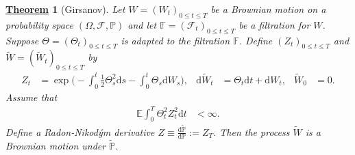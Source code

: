 \documentclass[12pt]{book}
\numberwithin{equation}{chapter}
\theoremstyle{plain}
\newtheorem{theorem}{\underline{Theorem}}
\numberwithin{theorem}{section}
\theoremstyle{definition}
\numberwithin{exercise}{chapter}
\newcommand{\<}{\langle}
\renewcommand{\>}{\rangle}
\renewcommand{\(}{\left(}
\renewcommand{\)}{\right)}
\renewcommand{\[}{\left[}
\renewcommand{\]}{\right]}
\newcommand\Eb{\mathds{E}}
\newcommand\Fb{\mathds{F}}
\newcommand\Pb{\mathds{P}}
\newcommand\Fc{\mathscr{F}}
\newcommand\Om{\Omega}
\newcommand\Pbt{\widetilde{\Pb}}
\newcommand\Wt{\widetilde{W}}
\newcommand\dd{\mathrm{d}}
\begin{document}
\begin{theorem}[Girsanov]
\label{thm:girsanov}
Let $W = (W_t)_{0 \leq t \leq T}$ be a Brownian motion on a probability space $(\Om,\Fc,\Pb)$ and let $\Fb=(\Fc_t)_{0 \leq t \leq T}$ be a filtration for $W$.  Suppose $\Theta = (\Theta_t)_{0 \leq t \leq T}$ is adapted to the filtration $\Fb$.  
Define $(Z_t)_{0 \leq t \leq T}$ and $\Wt = (\Wt_t)_{0 \leq t \leq T}$ by
\begin{align}
Z_t
	&=	\exp \Big( - \int_0^t \tfrac{1}{2} \Theta_s^2 \dd s - \int_0^t \Theta_s \dd W_s \Big) , &
\dd \Wt_t
	&=	\Theta_t \dd t + \dd W_t , &
\Wt_0
	&=	0 .
\end{align}
Assume that
\begin{align}
\Eb \int_0^T \Theta_t^2 Z_t^2 \dd t
	&< \infty .
\end{align}
Define a Radon-Nikod\'ym derivative $Z \equiv \frac{\dd \Pbt}{\dd \Pb} := Z_T$.  Then the process $\Wt$ is a Brownian motion under $\Pbt$.
\end{theorem}
\end{document}
